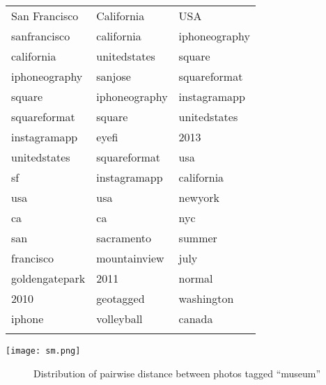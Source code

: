\begin{frame}

	\begin{scriptsize}
\begin{longtable}[c]{@{}lll@{}}
\hline\noalign{\medskip}
San Francisco & California & USA
\\\noalign{\medskip}
\hline\noalign{\medskip}
sanfrancisco & california & iphoneography
\\\noalign{\medskip}
california & unitedstates & square
\\\noalign{\medskip}
iphoneography & sanjose & squareformat
\\\noalign{\medskip}
square & iphoneography & instagramapp
\\\noalign{\medskip}
squareformat & square & unitedstates
\\\noalign{\medskip}
instagramapp & eyefi & 2013
\\\noalign{\medskip}
unitedstates & squareformat & usa
\\\noalign{\medskip}
sf & instagramapp & california
\\\noalign{\medskip}
usa & usa & newyork
\\\noalign{\medskip}
ca & ca & nyc
\\\noalign{\medskip}
san & sacramento & summer
\\\noalign{\medskip}
francisco & mountainview & july
\\\noalign{\medskip}
goldengatepark & 2011 & normal
\\\noalign{\medskip}
2010 & geotagged & washington
\\\noalign{\medskip}
iphone & volleyball & canada
\\\noalign{\medskip}
\hline
\end{longtable}
	\end{scriptsize}

\end{frame}

\begin{frame}

\begin{center} \texttt{[image: sm.png]} \end{center}

\end{frame}

{
\begin{frame}[plain]
        \begin{figure}
            \caption{{\footnotesize Distribution of pairwise distance between photos tagged \enquote{museum}}}
        \end{figure}
\end{frame}
}

